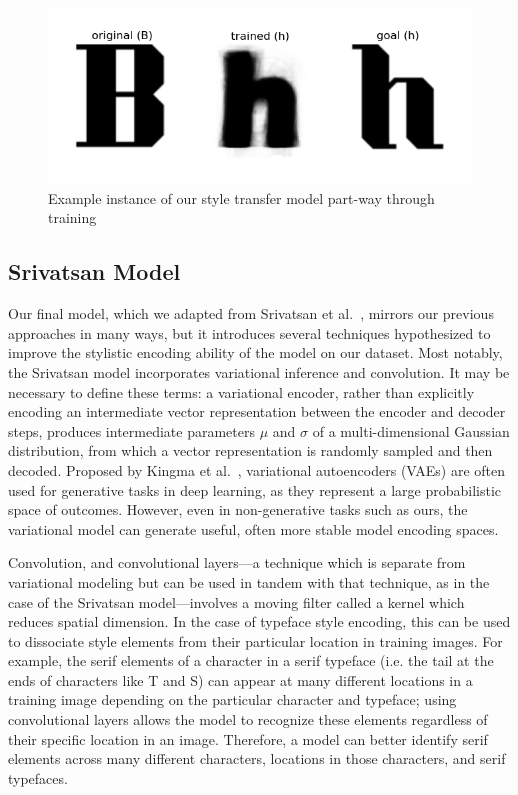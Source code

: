 \begin{figure}[h]
    \centering
    \includegraphics[width=\textwidth]{images/styletransfer-example.png}
    \caption{Example instance of our style transfer model part-way through training}
    \label{fig:styletransfer-example}
\end{figure}

\subsection{Srivatsan Model}

Our final model, which we adapted from Srivatsan et al.\ \cite{srivatsan2020}, mirrors our previous approaches in many ways, but it introduces several techniques hypothesized to improve the stylistic encoding ability of the model on our dataset. Most notably, the Srivatsan model incorporates variational inference and convolution. It may be necessary to define these terms: a variational encoder, rather than explicitly encoding an intermediate vector representation between the encoder and decoder steps, produces intermediate parameters $\mu$ and $\sigma$ of a multi-dimensional Gaussian distribution, from which a vector representation is randomly sampled and then decoded. Proposed by Kingma et al.\ \cite{kingma2019}, variational autoencoders (VAEs) are often used for generative tasks in deep learning, as they represent a large probabilistic space of outcomes. However, even in non-generative tasks such as ours, the variational model can generate useful, often more stable model encoding spaces.

Convolution, and convolutional layers---a technique which is separate from variational modeling but can be used in tandem with that technique, as in the case of the Srivatsan model---involves a moving filter called a kernel which reduces spatial dimension. In the case of typeface style encoding, this can be used to dissociate style elements from their particular location in training images. For example, the serif elements of a character in a serif typeface (i.e. the tail at the ends of characters like T and S) can appear at many different locations in a training image depending on the particular character and typeface; using convolutional layers allows the model to recognize these elements regardless of their specific location in an image. Therefore, a model can better identify serif elements across many different characters, locations in those characters, and serif typefaces.

